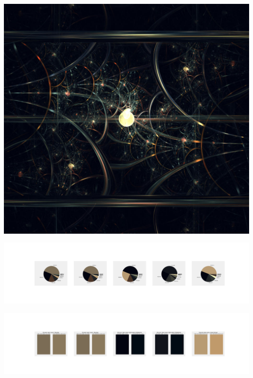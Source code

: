 \documentclass[11pt]{article}
\begin{document}
\begin{landscape}
    \begin{center}
    \includegraphics[width=\textwidth]{./nbimg/file (83).jpg}
    \end{center}

    \begin{center}
    \includegraphics[width=250mm]{./nbimg/pie-433.jpg}
    \end{center}

    \begin{center}
    \includegraphics[width=250mm]{./nbimg/peak-433.jpg}
    \end{center}
    


\end{landscape}
\end{document}
